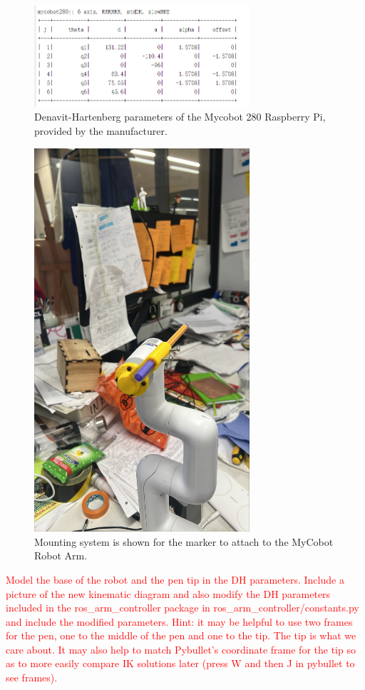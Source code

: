 \documentclass[11pt,a4paper]{article}
\begin{document}
\begin{figure}[h]
\includegraphics[width=8cm]{figures/dh_params_table.png}
\centering
\caption{Denavit-Hartenberg parameters of the Mycobot 280 Raspberry Pi, provided by the manufacturer.}
\label{fig:dh_table}
\end{figure}

\begin{figure}[h]
\includegraphics[width=8cm]{figures/marker_mount.jpeg}
\centering
\caption{Mounting system is shown for the marker to attach to the MyCobot Robot Arm.}
\label{fig:pen_mount}
\end{figure}

\textcolor{red}{Model the base of the robot and the pen tip in the DH parameters. Include a picture of the new kinematic diagram and also modify the DH parameters included in the ros\_arm\_controller package in ros\_arm\_controller/constants.py and include the modified parameters. Hint: it may be helpful to use two frames for the pen, one to the middle of the pen and one to the tip. The tip is what we care about. It may also help to match Pybullet's coordinate frame for the tip so as to more easily compare IK solutions later (press W and then J in pybullet to see frames).}
\end{document}
